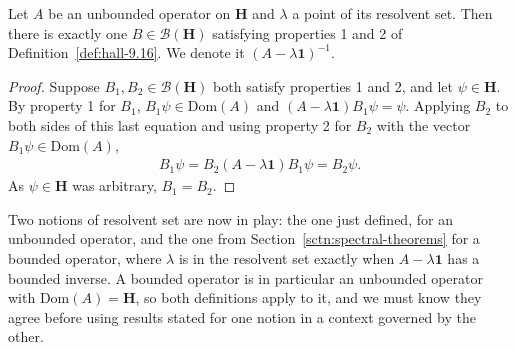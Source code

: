 \begin{lemma}
    \label{lmm:uniqueness-of-resolvent}
    \leanok
    Let $A$ be an unbounded operator on $\mathbf{H}$ and $\lambda$ a point of its resolvent set. Then there is exactly one $B \in \mathcal{B}(\mathbf{H})$ satisfying properties 1 and 2 of Definition~\ref{def:hall-9.16}. We denote it $(A - \lambda\mathbf{1})^{-1}$.
\end{lemma}
\begin{proof}
    \leanok
Suppose $B_1, B_2 \in \mathcal{B}(\mathbf{H})$ both satisfy properties 1 and 2, and let $\psi \in \mathbf{H}$. By property 1 for $B_1$, $B_1\psi \in \text{Dom}(A)$ and $(A-\lambda\mathbf{1})B_1\psi = \psi$. Applying $B_2$ to both sides of this last equation and using property 2 for $B_2$ with the vector $B_1\psi \in \text{Dom}(A)$,
\begin{align}
    B_1\psi = B_2(A - \lambda\mathbf{1})B_1\psi = B_2\psi.
\end{align}
As $\psi \in \mathbf{H}$ was arbitrary, $B_1 = B_2$.
\end{proof}

Two notions of resolvent set are now in play: the one just defined, for an unbounded operator, and the one from Section~\ref{sctn:spectral-theorems} for a bounded operator, where $\lambda$ is in the resolvent set exactly when $A - \lambda\mathbf{1}$ has a bounded inverse. A bounded operator is in particular an unbounded operator with $\text{Dom}(A) = \mathbf{H}$, so both definitions apply to it, and we must know they agree before using results stated for one notion in a context governed by the other.

